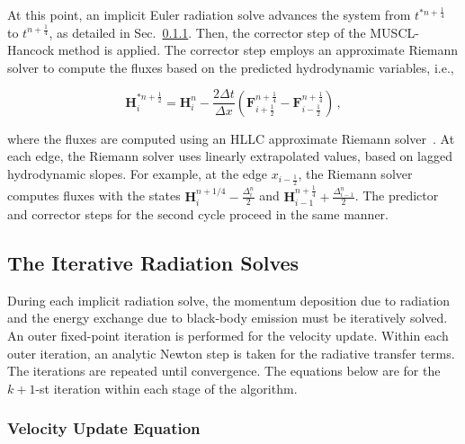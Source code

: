 \documentclass[preprint,12pt]{elsarticle}
\newcommand{\pec}{\, ,}
\newcommand{\half}{\frac{1}{2}}
\newcommand{\fourth}{\frac{1}{4}}
\renewcommand{\H}{\mathbf{H}}
\newcommand{\Flux}{\mathbf{F}}
\newcommand{\dt}{\Delta t}
\newcommand{\dx}{\Delta x}
\newcommand{\hydroCorrector}[5]{
\begin{equation}#5
  \H_i^{#3} = \H_i^{#1} - \frac{#4\dt}{\dx}
  \left(\Flux_{i+\half}^{#2} - \Flux_{i-\half}^{#2}\right) \pec
\end{equation}
}
\begin{document}
At this point, an implicit Euler radiation solve advances the system from $t^{*n+\fourth}$
to $t^{n+\fourth}$, as detailed in Sec.~\ref{}.  Then, the corrector step of the
MUSCL-Hancock method is applied.  The corrector step employs an approximate Riemann solver
to compute the fluxes based on the predicted hydrodynamic variables, i.e.,
\hydroCorrector{n}{n+\fourth}{*n+\half}{2}{\label{eq:muscl_corrector}}
where the fluxes are computed using an HLLC approximate Riemann solver~\cite{toro}.  At
each edge, the Riemann solver uses linearly extrapolated values, based on lagged
hydrodynamic slopes.  For example, at the edge
$x_{i-\half}$, the Riemann solver computes fluxes with the states
$\H_{i}^{n+1/4}-\frac{\Delta_i^n}{2}$ and $\H_{i-1}^{n+\fourth}+\frac{\Delta_{i-1}^n}{2}$.
The predictor and corrector steps for the second cycle proceed in the same manner.

\subsection{The Iterative Radiation Solves}

During each implicit radiation solve, the momentum deposition due to radiation and the
energy exchange due to black-body emission must be iteratively solved.  An outer fixed-point
iteration is performed for the velocity update.  Within each outer iteration, an analytic
Newton step is taken for the radiative transfer terms.  The iterations are repeated until 
convergence.  The equations below are for the $k+1$-st iteration within
each stage of the algorithm. 

\subsubsection{Velocity Update Equation}
\end{document}
